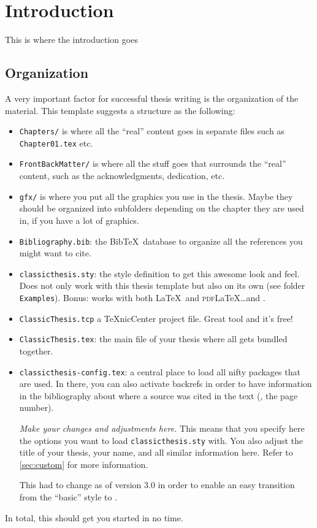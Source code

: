 \chapter{Introduction}\label{ch:introduction}
This is where the introduction goes
\section{Organization}
A very important factor for successful thesis writing is the
organization of the material. This template suggests a structure as
the following:
\begin{itemize}
    \item\texttt{Chapters/} is where all the ``real'' content goes in
    separate files such as \texttt{Chapter01.tex} etc.
    \item\texttt{FrontBackMatter/} is where all the stuff goes that
    surrounds the ``real'' content, such as the acknowledgments,
    dedication, etc.
    \item\texttt{gfx/} is where you put all the graphics you use in
    the thesis. Maybe they should be organized into subfolders
    depending on the chapter they are used in, if you have a lot of
    graphics.
    \item\texttt{Bibliography.bib}: the Bib\TeX\ database to organize
    all the references you might want to cite.
    \item\texttt{classicthesis.sty}: the style definition to get this
    awesome look and feel. Does not only work with this thesis template
    but also on its own (see folder \texttt{Examples}). Bonus: works
    with both \LaTeX\ and \textsc{pdf}\LaTeX\dots and \mLyX.
    \item\texttt{ClassicThesis.tcp} a \TeX nicCenter project file.
    Great tool and it's free!
    \item\texttt{ClassicThesis.tex}: the main file of your thesis
    where all gets bundled together.
    \item\texttt{classicthesis-config.tex}: a central place to load all 
    nifty packages that are used. In there, you can also activate 
    backrefs in order to have information in the bibliography about 
    where a source was cited in the text (\ie, the page number).
    
    \emph{Make your changes and adjustments here.} This means that you  
    specify here the options you want to load \texttt{classicthesis.sty} 
    with. You also adjust the title of your thesis, your name, and all 
    similar information here. Refer to \autoref{sec:custom} for more 
    information.
    
		This had to change as of version 3.0 in order to enable an easy 
		transition from the ``basic'' style to \mLyX.
    
\end{itemize}
In total, this should get you started in no time.


